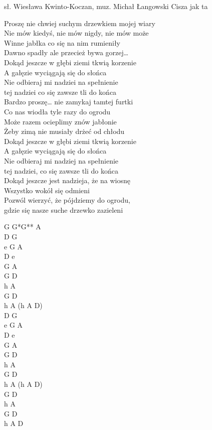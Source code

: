 {sł. Wiesława Kwinto-Koczan, muz. Michał Łangowski}
{Cisza jak ta}
\begin{text}
	\hfill\break
	Proszę nie chwiej suchym drzewkiem mojej wiary\\
	Nie mów kiedyś, nie mów nigdy, nie mów może \\
	Winne jabłka co się na nim rumieniły\\
	Dawno spadły ale przecież bywa gorzej…\\

	Dokąd jeszcze w głębi ziemi tkwią korzenie\\
	A gałęzie wyciągają się do słońca\\
	Nie odbieraj mi nadziei na spełnienie\\
	tej nadziei co się zawsze tli do końca\\

	Bardzo proszę… nie zamykaj tamtej furtki\\
	Co nas wiodła tyle razy do ogrodu\\
	Może razem ocieplimy znów jabłonie\\
	Żeby zimą nie musiały drżeć od chłodu\\

	Dokąd jeszcze w głębi ziemi tkwią korzenie\\
	A gałęzie wyciągają się do słońca\\
	Nie odbieraj mi nadziej na spełnienie\\
	tej nadziei, co się zawsze tli do końca\\

	Dokąd jeszcze jest nadzieja, że na wiosnę\\
	Wszystko wokół się odmieni\\
	Pozwól wierzyć, że pójdziemy do ogrodu,\\
	gdzie się nasze suche drzewko zazieleni\\
\end{text}
\begin{chord}
	G G*G** A\\
	D G\\
	e G A\\
	D e\\
	G A\\

	G D\\
	h A\\
	G D\\
	h A (h A D)\\

	D G\\
	e G A\\
	D e\\
	G A\\

	G D\\
	h A\\
	G D\\
	h A (h A D)\\
	
	G D\\
	h A\\
	G D\\
	h A D
\end{chord}
